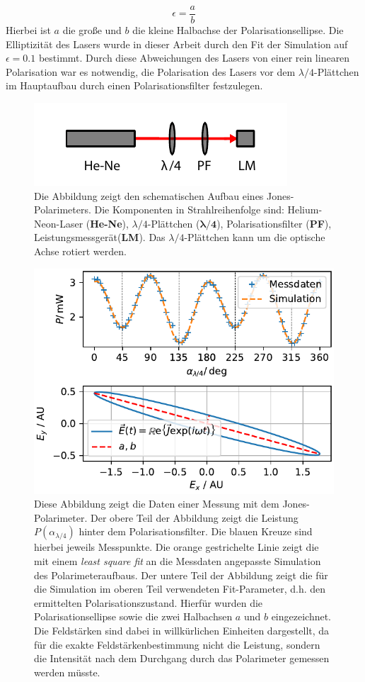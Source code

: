 \documentclass[a4paper, titlepage,  ngerman]{book}
\begin{document}
	\begin{equation}
		\epsilon = \dfrac{a}{b}
	\end{equation}
	Hierbei ist $a$ die große und $b$ die kleine Halbachse der Polarisationsellipse. Die Elliptizität des Lasers wurde in dieser Arbeit durch den Fit der Simulation auf $\epsilon = 0.1 $ bestimmt. Durch diese Abweichungen des Lasers von einer rein linearen Polarisation war es notwendig, die Polarisation des Lasers vor dem $\lambda /4$-Plättchen im Hauptaufbau durch einen Polarisationsfilter festzulegen.
	\begin{figure}
		\centering
		\includegraphics[width=0.5\linewidth]{figures/Polarimeter}
		\caption[Jones-Polarimeter]{Die Abbildung zeigt den schematischen Aufbau eines Jones-Polarimeters. Die Komponenten in Strahlreihenfolge sind: Helium-Neon-Laser (\textbf{He-Ne}), $\lambda/4$-Plättchen ($\boldsymbol{\lambda / 4}$), Polarisationsfilter (\textbf{PF}), Leistungsmessgerät(\textbf{LM}). Das $\lambda/4$-Plättchen kann um die optische Achse rotiert werden.}
		\label{fig:polarimeter}
	\end{figure}
	\begin{figure}
		\centering
		\includegraphics[width=0.7\linewidth]{figures/new/3_2_graph_polarimeter}
		\caption[Polarimeter Simulation]{Diese Abbildung zeigt die Daten einer Messung mit dem Jones-Polarimeter. Der obere Teil der Abbildung zeigt die Leistung $P(\alpha_{\lambda /4})$ hinter dem Polarisationsfilter. Die blauen Kreuze sind hierbei jeweils Messpunkte. Die orange gestrichelte Linie zeigt die mit einem \textit{least square fit} an die Messdaten angepasste Simulation des Polarimeteraufbaus. Der untere Teil der Abbildung zeigt die für die Simulation im oberen Teil verwendeten Fit-Parameter, d.h. den ermittelten Polarisationszustand. Hierfür wurden die Polarisationsellipse sowie die zwei Halbachsen $a$ und $b$ eingezeichnet. Die Feldstärken sind dabei in willkürlichen Einheiten dargestellt, da für die exakte Feldstärkenbestimmung nicht die Leistung, sondern die Intensität nach dem Durchgang durch das Polarimeter gemessen werden müsste.}
		\label{fig:graphpolarimeter}
	\end{figure}
\end{document}
